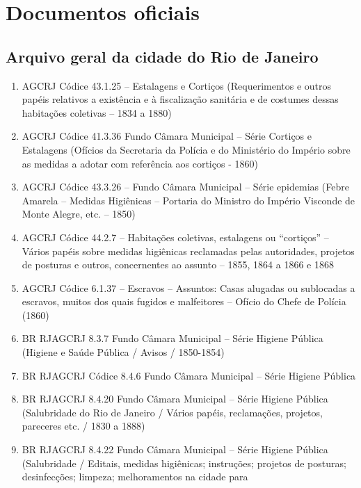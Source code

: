 \section*{Documentos oficiais}\label{documentos-oficiais}

\subsection*{Arquivo geral da cidade do Rio de
Janeiro}\label{arquivo-geral-da-cidade-do-rio-de-janeiro}

\begin{enumerate}
\def\labelenumi{\arabic{enumi}.}
\item
  AGCRJ Códice 43.1.25 -- Estalagens e Cortiços (Requerimentos e outros
  papéis relativos a existência e à fiscalização sanitária e de costumes
  dessas habitações coletivas -- 1834 a 1880)
\item
  AGCRJ Códice 41.3.36 Fundo Câmara Municipal -- Série Cortiços e
  Estalagens (Ofícios da Secretaria da Polícia e do Ministério do
  Império sobre as medidas a adotar com referência aos cortiços - 1860)
\item
  AGCRJ Códice 43.3.26 -- Fundo Câmara Municipal -- Série epidemias
  (Febre Amarela -- Medidas Higiênicas -- Portaria do Ministro do
  Império Visconde de Monte Alegre, etc. -- 1850)
\item
  AGCRJ Códice 44.2.7 -- Habitações coletivas, estalagens ou
  ``cortiços'' -- Vários papéis sobre medidas higiênicas reclamadas
  pelas autoridades, projetos de posturas e outros, concernentes ao
  assunto -- 1855, 1864 a 1866 e 1868
\item
  AGCRJ Códice 6.1.37 -- Escravos -- Assuntos: Casas alugadas ou
  sublocadas a escravos, muitos dos quais fugidos e malfeitores --
  Ofício do Chefe de Polícia (1860)
\item
  BR RJAGCRJ 8.3.7 Fundo Câmara Municipal -- Série Higiene Pública
  (Higiene e Saúde Pública / Avisos / 1850-1854)
\item
  BR RJAGCRJ Códice 8.4.6 Fundo Câmara Municipal -- Série Higiene
  Pública
\item
  BR RJAGCRJ 8.4.20 Fundo Câmara Municipal -- Série Higiene Pública
  (Salubridade do Rio de Janeiro / Vários papéis, reclamações, projetos,
  pareceres etc. / 1830 a 1888)
\item
  BR RJAGCRJ 8.4.22 Fundo Câmara Municipal -- Série Higiene Pública
  (Salubridade / Editais, medidas higiênicas; instruções; projetos de
  posturas; desinfecções; limpeza; melhoramentos na cidade para

\end{enumerate}

